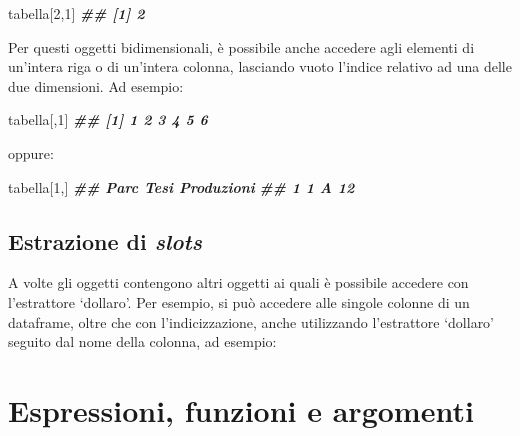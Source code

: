 \documentclass[
  12pt,
]{book}
\newenvironment{Shaded}{\begin{snugshade}}{\end{snugshade}}
\newcommand{\DecValTok}[1]{\textcolor[rgb]{0.00,0.00,0.81}{#1}}
\newcommand{\DocumentationTok}[1]{\textcolor[rgb]{0.56,0.35,0.01}{\textbf{\textit{#1}}}}
\newcommand{\NormalTok}[1]{#1}
\newcommand{\SpecialCharTok}[1]{\textcolor[rgb]{0.00,0.00,0.00}{#1}}
\begin{document}
\begin{Shaded}
\begin{Highlighting}[]
\NormalTok{tabella[}\DecValTok{2}\NormalTok{,}\DecValTok{1}\NormalTok{]}
\DocumentationTok{\#\# [1] 2}
\end{Highlighting}
\end{Shaded}

Per questi oggetti bidimensionali, è possibile anche accedere agli elementi di un'intera riga o di un'intera colonna, lasciando vuoto l'indice relativo ad una delle due dimensioni. Ad esempio:

\begin{Shaded}
\begin{Highlighting}[]
\NormalTok{tabella[,}\DecValTok{1}\NormalTok{]}
\DocumentationTok{\#\# [1] 1 2 3 4 5 6}
\end{Highlighting}
\end{Shaded}

oppure:

\begin{Shaded}
\begin{Highlighting}[]
\NormalTok{tabella[}\DecValTok{1}\NormalTok{,]}
\DocumentationTok{\#\#   Parc Tesi Produzioni}
\DocumentationTok{\#\# 1    1    A         12}
\end{Highlighting}
\end{Shaded}

\hypertarget{estrazione-di-slots}{%
\subsection{\texorpdfstring{Estrazione di \emph{slots}}{Estrazione di slots}}\label{estrazione-di-slots}}

A volte gli oggetti contengono altri oggetti ai quali è possibile accedere con l'estrattore `dollaro'. Per esempio, si può accedere alle singole colonne di un dataframe, oltre che con l'indicizzazione, anche utilizzando l'estrattore `dollaro' seguito dal nome della colonna, ad esempio:

\begin{Shaded}
\end{Shaded}

\hypertarget{espressioni-funzioni-e-argomenti}{%
\section{Espressioni, funzioni e argomenti}\label{espressioni-funzioni-e-argomenti}}
\end{document}
